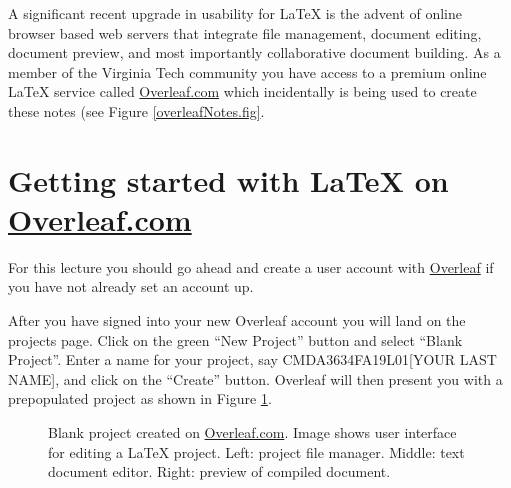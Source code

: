 A significant recent upgrade in usability for \LaTeX{} is the advent of online browser based web servers that integrate file management, document editing, document preview, and most importantly collaborative document building. As a member of the Virginia Tech community you have access to a premium online \LaTeX{} service called  \href{http://overleaf.com}{Overleaf.com} which incidentally is being used to create these notes (see Figure \ref{overleafNotes.fig}.

\section{Getting started with \LaTeX{} on \href{http://overleaf.com}{Overleaf.com}}

For this lecture you should go ahead and create a user account with \href{http://overleaf.com}{Overleaf} if you have not already set an account up.

After you have signed into your new Overleaf account you will land on the projects page. Click on the green ``New Project'' button and select ``Blank Project''. Enter a name for your project, say CMDA3634FA19L01[YOUR LAST NAME], and click on the ``Create'' button. Overleaf will then present you with a prepopulated project as shown in Figure \ref{overleafBlankProject.fig}. 

\begin{figure}[htbp!]
    \centering
    \caption{Blank project created on \href{http://overleaf.com}{Overleaf.com}. Image shows user interface for editing a \LaTeX{} project. Left: project file manager. Middle: text document editor. Right: preview of compiled document. }
    \label{overleafBlankProject.fig}
\end{figure}

